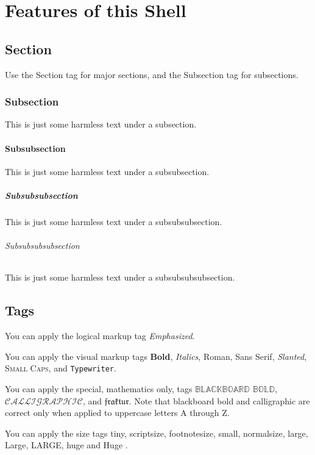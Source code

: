 \documentclass[11pt,spanish]{report}
\begin{document}
\chapter{Features of this Shell}

\section{Section}

Use the Section tag for major sections, and the Subsection tag for
subsections.

\subsection{Subsection}

This is just some harmless text under a subsection.

\subsubsection{Subsubsection}

This is just some harmless text under a subsubsection.

\paragraph{Subsubsubsection}

This is just some harmless text under a subsubsubsection.

\subparagraph{Subsubsubsubsection}

This is just some harmless text under a subsubsubsubsection.

\section{Tags}

You can apply the logical markup tag \emph{Emphasized}.

You can apply the visual markup tags \textbf{Bold}, \textit{Italics}, 
\textrm{Roman}, \textsf{Sans Serif}, \textsl{Slanted}, \textsc{Small Caps},
and \texttt{Typewriter}.

You can apply the special, mathematics only, tags $\mathbb{BLACKBOARD}$ $%
\mathbb{BOLD}$, $\mathcal{CALLIGRAPHIC}$, and $\mathfrak{fraktur}$. Note
that blackboard bold and calligraphic are correct only when applied to
uppercase letters A through Z.

You can apply the size tags {\tiny tiny}, {\scriptsize scriptsize}, 
{\footnotesize footnotesize}, {\small small}, {\normalsize normalsize}, 
{\large large}, {\Large Large}, {\LARGE LARGE}, {\huge huge} and {\Huge Huge}%
.
\end{document}
